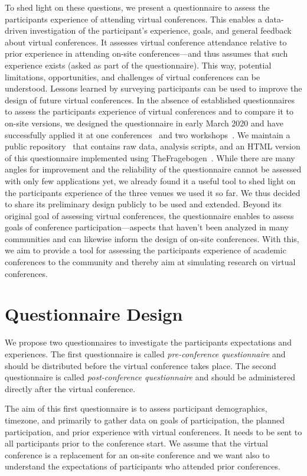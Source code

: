\documentclass[sigconf]{acmart}
\newcommand{\afblock}[1]{\noindent{\textbf{#1 }}}
\begin{document}
To shed light on these questions, we present a questionnaire to assess the participants experience of attending virtual conferences.
This enables a data-driven investigation of the participant's experience, goals, and general feedback about virtual conferences.
It assesses virtual conference attendance relative to prior experience in attending on-site conferences---and thus assumes that such experience exists (asked as part of the questionnaire).
This way, potential limitations, opportunities, and challenges of virtual conferences can be understood.
Lessons learned by surveying participants can be used to improve the design of future virtual conferences.
In the absence of established questionnaires to assess the participants experience of virtual conferences and to compare it to on-site versions, we designed the questionnaire in early March 2020 and have successfully applied it at one conferences~\cite{PAM2020} and two workshops~\cite{ItSecWorkshop, KuvsNetsoft}. 
We maintain a public repository~\cite{VirtualConferencesGithub} that contains raw data, analysis scripts, and an HTML version of this questionnaire implemented using TheFragebogen~\cite{TheFragebogen}.
While there are many angles for improvement and the reliability of the questionnaire cannot be assessed with only few applications yet, we already found it a useful tool to shed light on the participants experience of the three venues we used it so far.
We thus decided to share its preliminary design publicly to be used and extended.
Beyond its original goal of assessing virtual conferences, the questionnaire enables to assess goals of conference participation---aspects that haven't been analyzed in many communities and can likewise inform the design of on-site conferences.
With this, we aim to provide a tool for assessing the participants experience of academic conferences to the community and thereby aim at simulating research on virtual conferences.

\section{Questionnaire Design}
We propose two questionnaires to investigate the participants expectations and experiences.
The first questionnaire is called \textit{pre-conference questionnaire} and should be distributed before the virtual conference takes place.
The second questionnaire is called \textit{post-conference questionnaire} and should be administered directly after the virtual conference.

\afblock{Pre-Conference Questionnaire.}
The aim of this first questionnaire is to assess participant demographics, timezone, and primarily to gather data on goals of participation, the planned participation, and prior experience with virtual conferences.
It needs to be sent to all participants prior to the conference start.
We assume that the virtual conference is a replacement for an on-site conference and we want also to understand the expectations of participants who attended prior conferences.
\end{document}
